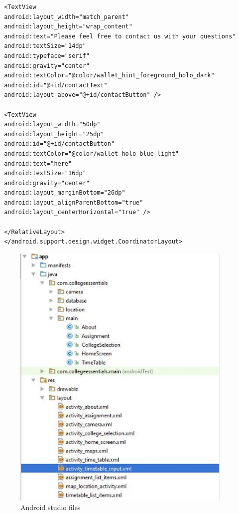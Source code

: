 \begin{verbatim}
 <TextView
 android:layout_width="match_parent"
 android:layout_height="wrap_content"
 android:text="Please feel free to contact us with your questions"
 android:textSize="14dp"
 android:typeface="serif"
 android:gravity="center"
 android:textColor="@color/wallet_hint_foreground_holo_dark"
 android:id="@+id/contactText"
 android:layout_above="@+id/contactButton" />
 
 <TextView
 android:layout_width="50dp"
 android:layout_height="25dp"
 android:id="@+id/contactButton"
 android:textColor="@color/wallet_holo_blue_light"
 android:text="here"
 android:textSize="16dp"
 android:gravity="center"
 android:layout_marginBottom="26dp"
 android:layout_alignParentBottom="true"
 android:layout_centerHorizontal="true" />
 
 </RelativeLayout>
 </android.support.design.widget.CoordinatorLayout>
 \end{verbatim}
 
 \begin{figure}[h]
 	\caption{Android studio files}
 	\includegraphics{img/screenshot.jpg}
 \end{figure}
 

